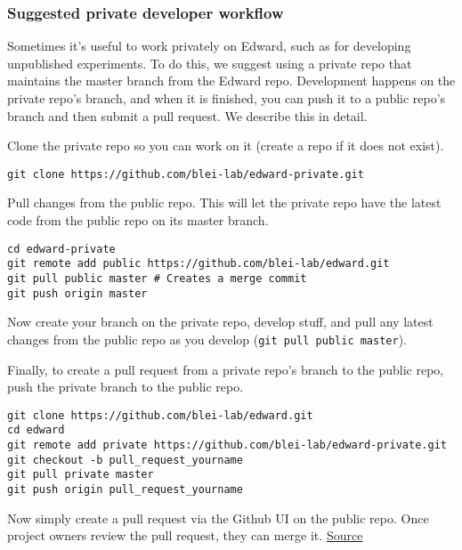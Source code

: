 \subsubsection{Suggested private developer workflow}
\label{suggested-private-workflow}

Sometimes it's useful to work privately on Edward, such as for
developing unpublished experiments.
To do this, we suggest using a private repo
that maintains the master branch from the Edward repo. Development
happens on the private repo's branch, and when it is finished, you can
push it to a public repo's branch and then submit a pull request. We
describe this in detail.

Clone the private repo so you can work on it (create a repo if it does
not exist).

\begin{lstlisting}[class=JSON]
git clone https://github.com/blei-lab/edward-private.git
\end{lstlisting}

Pull changes from the public repo. This will let the private repo have
the latest code from the public repo on its master branch.

\begin{lstlisting}[class=JSON]
cd edward-private
git remote add public https://github.com/blei-lab/edward.git
git pull public master # Creates a merge commit
git push origin master
\end{lstlisting}

Now create your branch on the private repo, develop stuff, and pull any
latest changes from the public repo as you develop
(\texttt{git\ pull\ public\ master}).

Finally, to create a pull request from a private repo's branch to the
public repo, push the private branch to the public repo.

\begin{lstlisting}[class=JSON]
git clone https://github.com/blei-lab/edward.git
cd edward
git remote add private https://github.com/blei-lab/edward-private.git
git checkout -b pull_request_yourname
git pull private master
git push origin pull_request_yourname
\end{lstlisting}

Now simply create a pull request via the Github UI on the public repo.
Once project owners review the pull request, they can merge it.
\href{http://stackoverflow.com/questions/10065526/github-how-to-make-a-fork-of-public-repository-private/30352360\#30352360}{Source}
